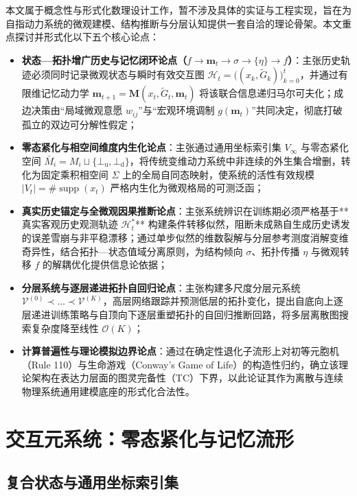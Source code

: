 \documentclass[11pt,a4paper]{article}
\numberwithin{equation}{section}
\theoremstyle{definition}
\theoremstyle{remark}
\DeclareMathOperator{\supp}{\mathrm{supp}} %
\begin{document}
	本文属于概念性与形式化数理设计工作，暂不涉及具体的实证与工程实现，旨在为自指动力系统的微观建模、结构推断与分层认知提供一套自洽的理论骨架。本文重点探讨并形式化以下五个核心论点：
	\begin{itemize}[leftmargin=2em]
		\item \textbf{状态—拓扑增广历史与记忆闭环论点（$f \to \mathbf{m}_t \to \sigma \to \{\eta\} \to f$）}：主张历史轨迹必须同时记录微观状态与瞬时有效交互图 $\mathcal{H}_t = \big( (x_k, \widetilde{G}_k) \big)_{k=0}^t$，并通过有限维记忆动力学 $\mathbf{m}_{t+1} = \mathbf{M}(x_t, \widetilde{G}_t, \mathbf{m}_t)$ 将该联合信息递归马尔可夫化；成边决策由“局域微观意愿 $w_{ij}$”与“宏观环境调制 $g(\mathbf{m}_t)$”共同决定，彻底打破孤立的双边可分解性假定；
		\item \textbf{零态紧化与相空间维度内生化论点}：主张通过通用坐标索引集 $V_\infty$ 与零态紧化空间 $\bar{M}_i = M_i \sqcup \{\bot_{\mathrm{u}}, \bot_{\mathrm{d}}\}$，将传统变维动力系统中非连续的外生集合增删，转化为固定乘积相空间 $\Sigma$ 上的全局自同态映射，使系统的活性有效规模 $|V_t|=\#\supp(x_t)$ 严格内生化为微观格局的可测泛函；
		\item \textbf{真实历史锚定与全微观因果推断论点}：主张系统辨识在训练期必须严格基于**真实客观历史观测轨迹 $\mathcal{H}_t^\ast$** 构建条件转移似然，阻断未成熟自生成历史诱发的误差雪崩与非平稳漂移；通过单步似然的维数裂解与分层参考测度消解变维奇异性，结合拓扑—状态值域分离原则，为结构倾向 $\sigma$、拓扑传播 $\eta$ 与微观转移 $f$ 的解耦优化提供信息论依据；
		\item \textbf{分层系统与逐层递进拓扑自回归论点}：主张构建多尺度分层元系统 $\mathcal{V}^{(0)} \prec \dots \prec \mathcal{V}^{(K)}$，高层网络跟踪并预测低层的拓扑变化，提出自底向上逐层递进训练策略与自顶向下逐层重塑拓扑的自回归推断回路，将多层离散图搜索复杂度降至线性 $\mathcal{O}(K)$；
		\item \textbf{计算普遍性与理论模拟边界论点}：通过在确定性退化子流形上对初等元胞机（Rule 110）与生命游戏（Conway's Game of Life）的构造性归约，确立该理论架构在表达力层面的图灵完备性（TC）下界，以此论证其作为离散与连续物理系统通用建模底座的形式化合法性。
	\end{itemize}
	
	\section{交互元系统：零态紧化与记忆流形}\label{sec:base}
	
	\subsection{复合状态与通用坐标索引集}
	
\end{document}

